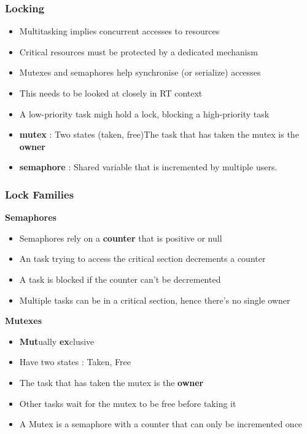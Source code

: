\begin{frame}
  \frametitle{Locking}
	\begin{itemize}
		\item Multitasking implies concurrent accesses to resources
		\item Critical resources must be protected by a dedicated mechanism
		\item Mutexes and semaphores help synchronise (or serialize) accesses
		\item This needs to be looked at closely in RT context
		\item A low-priority task migh hold a lock, blocking a high-priority task
	\end{itemize}
	\begin{itemize}
		\item \textbf{mutex} : Two states (taken, free)The task that has taken the mutex is the \textbf{owner}
		\item \textbf{semaphore} : Shared variable that is incremented by multiple users. 
	\end{itemize}
\end{frame}

\begin{frame}
	\frametitle{Lock Families}
		\begin{center}\textbf{Semaphores}\end{center}
		\begin{itemize}
			\item Semaphores rely on a \textbf{counter} that is positive or null
			\item An task trying to access the critical section decrements a counter
			\item A task is blocked if the counter can't be decremented
			\item Multiple tasks can be in a critical section, hence there's no single owner
		\end{itemize}
		\begin{center}\textbf{Mutexes}\end{center}
		\begin{itemize}
			\item \textbf{Mut}ually \textbf{ex}clusive
			\item Have two states : Taken, Free
			\item The task that has taken the mutex is the \textbf{owner}
			\item Other tasks wait for the mutex to be free before taking it
			\item A Mutex is a semaphore with a counter that can only be incremented once
		\end{itemize}


\end{frame}

